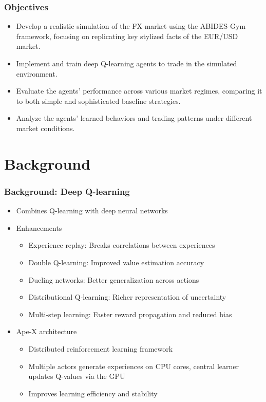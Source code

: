 \documentclass{beamer}
\begin{document}
\begin{frame}
  \frametitle{Objectives}

  \begin{itemize}
    \item Develop a realistic simulation of the FX market using the ABIDES-Gym framework, focusing on replicating key stylized facts of the EUR/USD market.
    \item Implement and train deep Q-learning agents to trade in the simulated environment.
    \item Evaluate the agents' performance across various market regimes, comparing it to
  both simple and sophisticated baseline strategies.
    \item Analyze the agents' learned behaviors and trading patterns under different market
  conditions.
  \end{itemize}

\end{frame}

\section{Background}

\begin{frame}
  \frametitle{Background: Deep Q-learning}

  \begin{itemize}
    \item Combines Q-learning with deep neural networks
    \item Enhancements
    \begin{itemize}
      \item Experience replay: Breaks correlations between experiences \cite{mnih2015humanlevel}
      \item Double Q-learning: Improved value estimation accuracy \cite{vanhasselt2015deep}
      \item Dueling networks: Better generalization across actions \cite{wang2016dueling}
      \item Distributional Q-learning: Richer representation of uncertainty \cite{bellemare2017distributional}
      \item Multi-step learning: Faster reward propagation and reduced bias \cite{sutton1998reinforcement}
    \end{itemize}
    \item Ape-X architecture \cite{horgan2018distributed}
    \begin{itemize}
      \item Distributed reinforcement learning framework
      \item Multiple actors generate experiences on CPU cores, central learner updates Q-values via the GPU
      \item Improves learning efficiency and stability
    \end{itemize}
  \end{itemize}
\end{frame}
\end{document}
